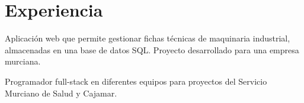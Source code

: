 \documentclass[letterpaper]{deedy-resume} %
\begin{document}
\begin{minipage}[t]{0.66\textwidth} %






\section{Experiencia}

\fontsize{10pt}{12pt}\normalfont
\vspace{\topsep} %
\begin{tightitemize}
\item Aplicación web que permite gestionar fichas técnicas de maquinaria industrial, almacenadas en una base de datos SQL. Proyecto desarrollado para una empresa murciana.
\end{tightitemize}

\sectionspace

\begin{tightitemize}
\item Programador full-stack en diferentes equipos para proyectos del Servicio Murciano de Salud y Cajamar.
\end{tightitemize}

\sectionspace



\end{minipage}
\end{document}
